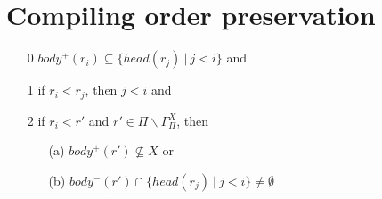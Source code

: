 \section{Compiling order preservation}


\begin{itemize}
  \item[0] $body^+(r_i) \subseteq \{ head(r_j)~|~j<i\}$ and \\
  \item[1] if $r_i < r_j$, then $j<i$ and \\
  \item[2] if $r_i < r'$ and $r' \in \Pi \backslash \Gamma_{\Pi}^X$, then
    \begin{itemize}
      \item[(a)] $body^+(r') \not \subseteq X$ or
      \item[(b)] $body^-(r') \cap \{head(r_j)~|~j<i\} \not = \emptyset$
    \end{itemize}
\end{itemize}


